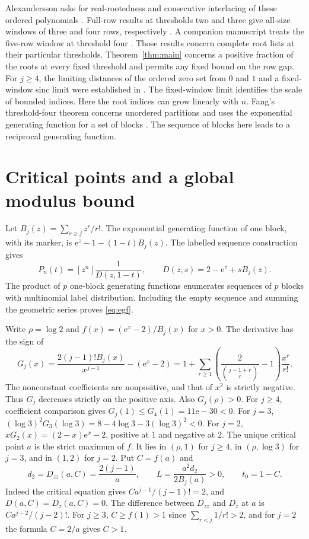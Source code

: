 \documentclass[11pt]{article}
\newcommand{\ee}{\mathrm e}
\begin{document}
Alexandersson asks for real-rootedness and consecutive interlacing
of these ordered polynomials \cite{symcat}. Full-row results at
thresholds two and three give all-size windows of three and four rows,
respectively \cite{two,three}. A companion manuscript treats the
five-row window at threshold four \cite{four}. Those results concern
complete root lists at their particular thresholds. Theorem~\ref{thm:main}
concerns a positive fraction of the roots at every fixed threshold and
permits any fixed bound on the row gap. For $j\ge4$, the limiting distances
of the ordered zero set from $0$ and $1$ and a fixed-window sinc limit
were established in \cite{radii}. The fixed-window limit identifies
the scale of bounded indices. Here the root indices can grow
linearly with $n$. Fang's threshold-four theorem concerns unordered
partitions and uses the exponential generating function for a set
of blocks \cite{fang}. The sequence of blocks here leads to
a reciprocal generating function.

\section{Critical points and a global modulus bound}

Let $B_j(z)=\sum_{r\ge j} z^r/r!$. The exponential generating function
of one block, with its marker, is $\ee^z-1-(1-t)B_j(z)$. The labelled
sequence construction gives
\begin{equation}\label{eq:egf}
 P_n(t)=[z^n]\frac{1}{D(z,1-t)},\qquad
 D(z,s)=2-\ee^z+s B_j(z).
\end{equation}
The product of $p$ one-block generating functions enumerates sequences
of $p$ blocks with multinomial label distribution. Including the empty
sequence and summing the geometric series proves \eqref{eq:egf}.

Write $\rho=\log 2$ and $f(x)=(\ee^x-2)/B_j(x)$ for $x>0$. The
derivative has the sign of
\[
 G_j(x)=\frac{2(j-1)! B_j(x)}{x^{j-1}}-(\ee^x-2)
 =1+\sum_{r\ge1}
       \left(\frac{2}{\binom{j-1+r}{r}}-1\right)\frac{x^r}{r!}.
\]
The nonconstant coefficients are nonpositive, and that of $x^2$ is
strictly negative. Thus $G_j$ decreases strictly on the positive axis.
Also $G_j(\rho)>0$. For $j\ge4$, coefficient comparison gives
$G_j(1)\le G_4(1)=11\ee-30<0$. For $j=3$,
$(\log 3)^2 G_3(\log 3)=8-4\log 3-3(\log 3)^2<0$. For $j=2$,
$xG_2(x)=(2-x)\ee^x-2$, positive at $1$ and negative at $2$.
The unique critical point $a$ is the strict maximum of $f$. It lies
in $(\rho,1)$ for $j\ge4$, in $(\rho,\log 3)$ for $j=3$, and in
$(1,2)$ for $j=2$. Put $C=f(a)$ and
\begin{equation}\label{eq:contact}
 d_2=D_{zz}(a,C)=\frac{2(j-1)}a,\qquad
 L=\frac{a^2d_2}{2B_j(a)}>0,\qquad t_0=1-C.
\end{equation}
Indeed the critical equation gives $C a^{j-1}/(j-1)!=2$,
and $D(a,C)=D_z(a,C)=0$. The difference between $D_{zz}$ and $D_z$
at $a$ is $C a^{j-2}/(j-2)!$. For $j\ge3$, $C\ge f(1)>1$
since $\sum_{r<j}1/r!>2$, and for $j=2$ the formula $C=2/a$ gives
$C>1$.
\end{document}
